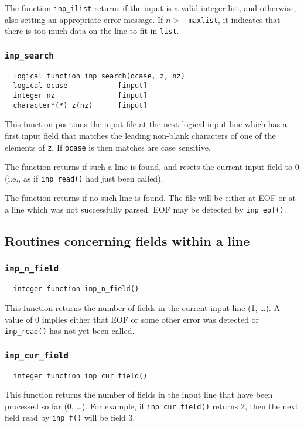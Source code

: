 The function \verb+inp_ilist+ returns \TRUE if the input is a valid integer
list, and \FALSE otherwise, also setting an appropriate error
message.  If $n > $ ~{\tt maxlist}, it indicates that there is too
much data on the line to fit in {\tt list}.

\subsubsection{{\tt inp\_search}}
\begin{verbatim}
  logical function inp_search(ocase, z, nz)
  logical ocase            [input]
  integer nz               [input]
  character*(*) z(nz)      [input]
\end{verbatim}
This function positions the input file at the next logical input line which has a
first input field that matches the leading non-blank characters of one
of the elements of \verb+z+.  If \verb+ocase+ is \TRUE then matches are case
sensitive.

The function returns \TRUE if such a line is found, and resets the
current input field to 0 (i.e., as if \verb+inp_read()+ had just been
called).

The function returns \FALSE if no such line is found.  The file will be
either at EOF or at a line which was not successfully parsed.  EOF may
be detected by \verb+inp_eof()+.

\subsection{Routines concerning fields within a line}

\subsubsection{{\tt inp\_n\_field}}
\begin{verbatim}
  integer function inp_n_field()
\end{verbatim}
This function returns the number of fields in the current input line (1, \ldots).  A
value of 0 implies either that EOF or some other error was detected or
{\tt inp\_read()} has not yet been called.

\subsubsection{{\tt inp\_cur\_field}}
\begin{verbatim}
  integer function inp_cur_field()
\end{verbatim}
This function returns the number of fields in the input line that have been processed
so far (0, \ldots).  For example, if {\tt inp\_cur\_field()} returns 2, then the next
field read by {\tt inp\_f()} will be field 3.

